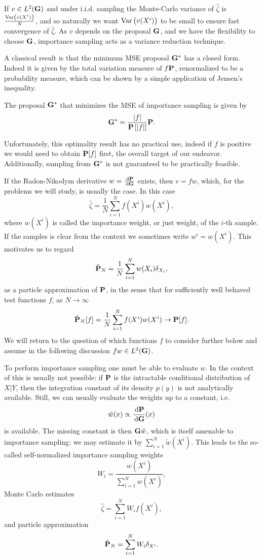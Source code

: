 If $v \in L^{2}(\G)$ and under i.i.d. sampling the Monte-Carlo variance of $\hat \zeta$ is $\frac{\var \left(v(X^{i})\right)}{N}$, and so naturally we want $\var \left(v(X^{i})\right)$ to be small to ensure fast convergence of $\hat \zeta$. As $v$ depends on the proposal $\G$, and we have the flexibility to choose $\G$, importance sampling acts as a variance reduction technique. 

A classical result is that the minimum MSE proposal $\G^\ast$ has a closed form. Indeed it is given by the total variation measure of $f\P$, renormalized to be a probability measure, which can be shown by a simple application of Jensen's inequality. 
\begin{proposition}
    \label{prop:minimum_MSE_IS}
    The proposal $\G^{\ast}$ that minimizes the MSE of importance sampling is given by
    $$
    \G^{\ast}  = \frac{\lvert f \rvert}{\P\left[\lvert f \rvert \right]} \P.
    $$
\end{proposition}
Unfortunately, this optimality result has no practical use, indeed if $f$ is positive we would need to obtain $\P[f]$ first, the overall target of our endeavor. Additionally, sampling from $\G^{\ast}$ is not guaranteed to be practically feasible. 

If the Radon-Nikodym derivative $w = \frac{\d\P}{\d\G}$ exists, then $v = fw$, which, for the problems we will study, is usually the case. In this case 
$$
\hat \zeta = \frac{1}{N} \sum_{i = 1}^N f(X^{i})w(X^{i}),
$$
where $w(X^{i})$ is called the importance weight, or just weight, of the $i$-th sample. If the samples is clear from the context we sometimes write $w^{i} = w(X^{i})$. 
This motivates us to regard
\begin{align}
\label{eq:is-particle-approximation}
\hat \P_N = \frac{1}{N} \sum_{i = 1}^{N} w(X_i) \delta_{X_i},
\end{align}
as a particle approximation of $\P$, in the sense that for sufficiently well behaved test functions $f$, as $N \to \infty$ $$
\hat\P_{N}[f] = \frac{1}{N} \sum_{i = 1}^N f(X^{i})w(X^{i})\to \P [f].
$$
We will return to the question of which functions $f$ to consider further below and assume in the following discussion $fw \in L^{2}(\G)$.

To perform importance sampling one must be able to evaluate $w$. In the context of  this is usually not possible: if $\P$ is the intractable conditional distribution of $X|Y$, then the integration constant of its density $p(y)$ is not analytically available.
Still, we can usually evaluate the weights up to a constant, i.e. $$\tilde w(x) \propto \frac{\d \P}{\d \G}(x)$$ is available. The missing constant is then $\G \tilde w$, which is itself amenable to importance sampling: we may estimate it by $\sum_{i = 1}^N \tilde w(X^{i})$.
This leads to the so-called self-normalized importance sampling weights 
$$W_i = \frac{w(X^i)}{\sum_{i = 1}^N w(X^i)},$$
Monte Carlo estimates 
$$\hat \zeta = \sum_{i = 1}^{N} W_i f(X^i),$$
and particle approximation 
$$\hat \P_N = \sum_{i = 1}^{N} W_i \delta_{X^i}.$$

